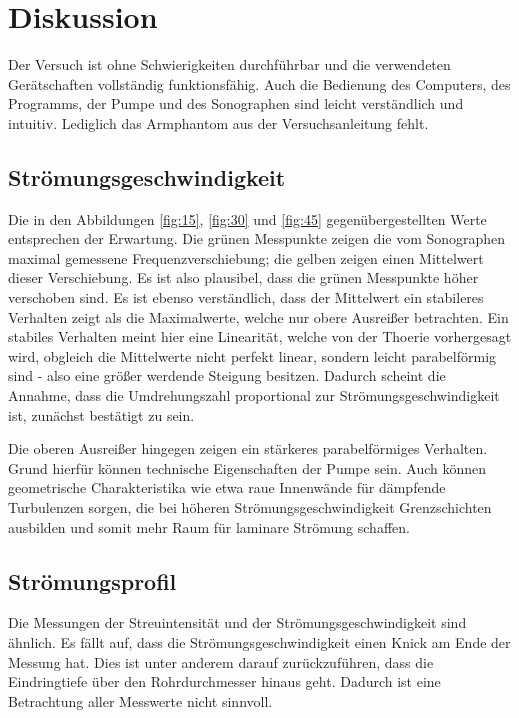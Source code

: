 \section{Diskussion}
\label{sec:Diskussion}

Der Versuch ist ohne Schwierigkeiten durchführbar und die verwendeten Gerätschaften vollständig funktionsfähig.
Auch die Bedienung des Computers, des Programms, der Pumpe und des Sonographen sind leicht verständlich und intuitiv.
Lediglich das Armphantom aus der Versuchsanleitung fehlt.

\subsection{Strömungsgeschwindigkeit}
Die in den Abbildungen \ref{fig:15}, \ref{fig:30} und \ref{fig:45} gegenübergestellten Werte entsprechen der Erwartung.
Die grünen Messpunkte zeigen die vom Sonographen maximal gemessene Frequenzverschiebung; die gelben zeigen einen Mittelwert dieser Verschiebung.
Es ist also plausibel, dass die grünen Messpunkte höher verschoben sind. Es ist ebenso verständlich, dass der Mittelwert ein stabileres Verhalten zeigt als die Maximalwerte,
welche nur obere Ausreißer betrachten. Ein stabiles Verhalten meint hier eine Linearität, welche von der Thoerie vorhergesagt wird, obgleich die Mittelwerte nicht perfekt linear, sondern
leicht parabelförmig sind - also eine größer werdende Steigung besitzen. Dadurch scheint die Annahme, dass die Umdrehungszahl proportional
zur Strömungsgeschwindigkeit ist, zunächst bestätigt zu sein.

Die oberen Ausreißer hingegen zeigen ein stärkeres parabelförmiges Verhalten. Grund hierfür können technische Eigenschaften der Pumpe sein.
Auch können geometrische Charakteristika wie etwa raue Innenwände für dämpfende Turbulenzen sorgen, die bei höheren Strömungsgeschwindigkeit Grenzschichten ausbilden und somit
mehr Raum für laminare Strömung schaffen. 

\subsection{Strömungsprofil}
Die Messungen der Streuintensität und der Strömungsgeschwindigkeit sind ähnlich. Es fällt auf, dass die Strömungsgeschwindigkeit einen Knick am Ende der Messung hat. Dies ist unter
anderem darauf zurückzuführen, dass die Eindringtiefe über den Rohrdurchmesser hinaus geht. Dadurch ist eine Betrachtung aller Messwerte nicht sinnvoll.

